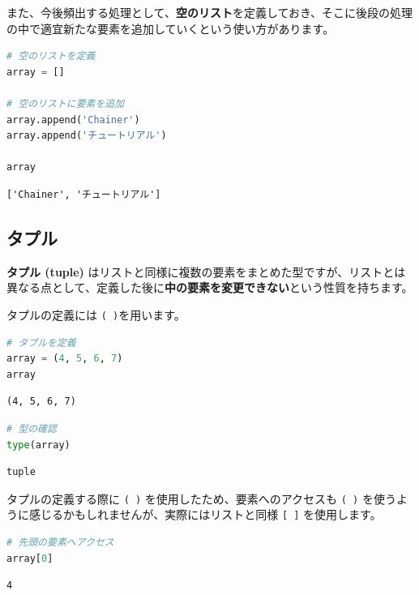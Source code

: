 また、今後頻出する処理として、\textbf{空のリスト}を定義しておき、そこに後段の処理の中で適宜新たな要素を追加していくという使い方があります。


\begin{lstlisting}[style=codecell,language=Python]
# 空のリストを定義
array = []

# 空のリストに要素を追加
array.append('Chainer')
array.append('チュートリアル')

array
\end{lstlisting}

\begin{lstlisting}[style=outputcell]
['Chainer', 'チュートリアル']
\end{lstlisting}

\subsection{タプル}


\textbf{タプル (tuple)} はリストと同様に複数の要素をまとめた型ですが、リストとは異なる点として、定義した後に\textbf{中の要素を変更できない}という性質を持ちます。


タプルの定義には \texttt{( )}を用います。


\begin{lstlisting}[style=codecell,language=Python]
# タプルを定義
array = (4, 5, 6, 7)
array
\end{lstlisting}

\begin{lstlisting}[style=outputcell]
(4, 5, 6, 7)
\end{lstlisting}

\begin{lstlisting}[style=codecell,language=Python]
# 型の確認
type(array)
\end{lstlisting}

\begin{lstlisting}[style=outputcell]
tuple
\end{lstlisting}

タプルの定義する際に \texttt{( )} を使用したため、要素へのアクセスも \texttt{( )} を使うように感じるかもしれませんが、実際にはリストと同様 \texttt{[ ]} を使用します。


\begin{lstlisting}[style=codecell,language=Python]
# 先頭の要素へアクセス
array[0]
\end{lstlisting}

\begin{lstlisting}[style=outputcell]
4
\end{lstlisting}

